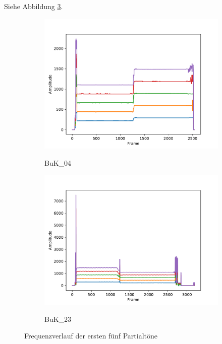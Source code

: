 \subsection{}
Siehe Abbildung \ref{fig:freq}.

\begin{figure}[H]
    \centering
    \begin{subfigure}{.5\textwidth}
        \centering
        \caption{BuK\_04}
        \includegraphics[width=\linewidth]{Figures/Buk04_frequencies.pdf}
        \label{fig:sub1}
    \end{subfigure}%
    \begin{subfigure}{.5\textwidth}
        \centering
        \caption{BuK\_23}
        \includegraphics[width=\linewidth]{Figures/Buk23_frequencies.pdf}
        \label{fig:sub2}
    \end{subfigure}
    \caption{Frequenzverlauf der ersten fünf Partialtöne}
    \label{fig:freq}
\end{figure}


